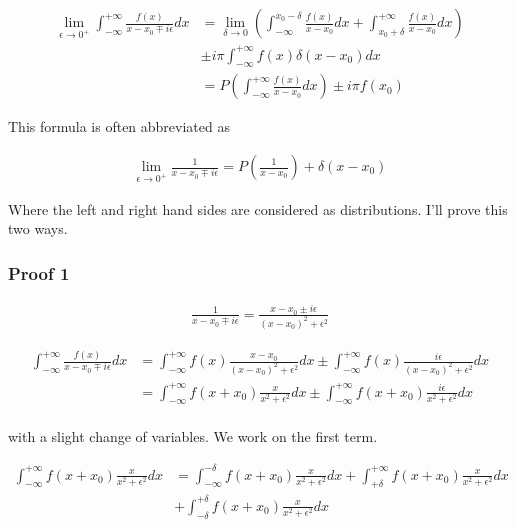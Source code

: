 \documentclass[12pt]{article}
\begin{document}
\begin{align}
\lim_{\epsilon \rightarrow 0^+} \int_{-\infty}^{+\infty} \frac{f(x)}{x - x_0 \mp i \epsilon} dx &= \lim_{\delta \rightarrow 0} \left(\int_{-\infty}^{x_0-\delta} \frac{f(x)}{x-x_0}dx + \int_{x_0+\delta}^{+\infty} \frac{f(x)}{x-x_0}dx \right)\\
&\pm i \pi \int_{-\infty}^{+\infty} f(x) \delta(x-x_0) dx \\
 &= P\left(\int_{-\infty}^{+\infty} \frac{f(x)}{x-x_0}dx\right) \pm i \pi f(x_0)
\end{align}

This formula is often abbreviated as

\begin{align}
\lim_{\epsilon \rightarrow 0^+}\frac{1}{x - x_0 \mp i \epsilon} = P\left(\frac{1}{x-x_0}\right) + \delta(x-x_0)
\end{align}

Where the left and right hand sides are considered as distributions. I'll prove this two ways.

\subsubsection{Proof 1}

\begin{align}
\frac{1}{x-x_0 \mp i \epsilon} = \frac{x-x_0\pm i \epsilon}{(x-x_0)^2+\epsilon^2}
\end{align}

\begin{align}
\int_{-\infty}^{+\infty} \frac{f(x)}{x - x_0 \mp i \epsilon} dx &= \int_{-\infty}^{+\infty} f(x) \frac{x-x_0}{(x-x_0)^2+\epsilon^2} dx \pm \int_{-\infty}^{+\infty} f(x) \frac{i \epsilon}{(x-x_0)^2+\epsilon^2} dx\\
&= \int_{-\infty}^{+\infty} f(x+x_0) \frac{x}{x^2+\epsilon^2} dx \pm \int_{-\infty}^{+\infty} f(x+x_0) \frac{i \epsilon}{x^2+\epsilon^2} dx\\
\end{align}

with a slight change of variables. We work on the first term.

\begin{align}
\int_{-\infty}^{+\infty} f(x+x_0) \frac{x}{x^2+\epsilon^2} dx  &= \int_{-\infty}^{-\delta} f(x+x_0) \frac{x}{x^2+\epsilon^2} dx + \int_{+\delta}^{+\infty} f(x+x_0) \frac{x}{x^2+\epsilon^2} dx\\ 
&+ \int_{-\delta}^{+\delta} f(x+x_0) \frac{x}{x^2+\epsilon^2} dx 
\end{align}
\end{document}
